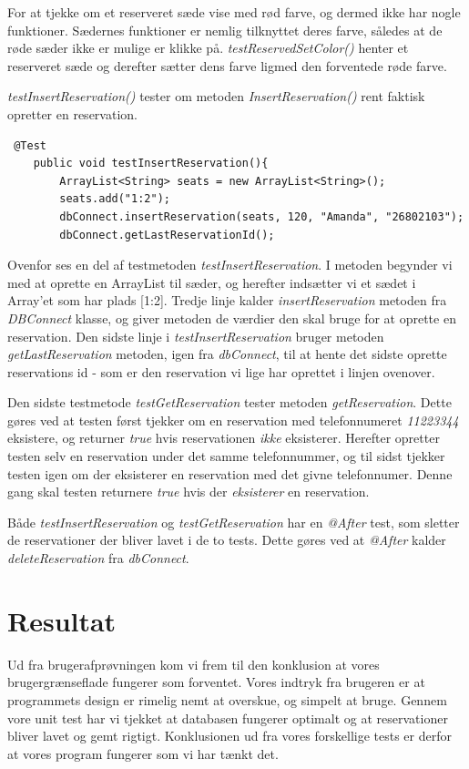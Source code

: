 \documentclass[final]{report}
\begin{document}
For at tjekke om et reserveret sæde vise med rød farve, og dermed ikke har nogle funktioner. Sædernes funktioner er nemlig tilknyttet deres farve, således at de røde sæder ikke er mulige er klikke på. \emph{testReservedSetColor()} henter et reserveret sæde og derefter sætter dens farve ligmed den forventede røde farve. 

\emph{testInsertReservation()} tester om metoden \emph{InsertReservation()} rent faktisk opretter en reservation. \\
\begin{verbatim}
 @Test
    public void testInsertReservation(){
        ArrayList<String> seats = new ArrayList<String>();
        seats.add("1:2");
        dbConnect.insertReservation(seats, 120, "Amanda", "26802103");
        dbConnect.getLastReservationId();
\end{verbatim}
 
Ovenfor ses en del af testmetoden \emph{testInsertReservation}. I metoden begynder vi med at oprette en ArrayList til sæder, og herefter indsætter vi et sædet i Array'et som har plads [1:2]. Tredje linje kalder \emph{insertReservation} metoden fra \emph{DBConnect} klasse, og giver metoden de værdier den skal bruge for at oprette en reservation. Den sidste linje i \emph{testInsertReservation} bruger metoden \emph{getLastReservation} metoden, igen fra \emph{dbConnect}, til at hente det sidste oprette reservations id - som er den reservation vi lige har oprettet i linjen ovenover. 

Den sidste testmetode \emph{testGetReservation} tester metoden \emph{getReservation}. Dette gøres ved at testen først tjekker om en reservation med telefonnumeret \emph{11223344} eksistere, og returner \emph{true} hvis reservationen \emph{ikke} eksisterer. Herefter opretter testen selv en reservation under det samme telefonnummer, og til sidst tjekker testen igen om der eksisterer en reservation med det givne telefonnumer. Denne gang skal testen returnere \emph{true} hvis der \emph{eksisterer} en reservation. 

Både \emph{testInsertReservation} og \emph{testGetReservation} har en \emph{@After} test, som sletter de reservationer der bliver lavet i de to tests. Dette gøres ved at \emph{@After} kalder \emph{deleteReservation} fra \emph{dbConnect}.


\section{Resultat}
Ud fra brugerafprøvningen kom vi frem til den konklusion at vores brugergrænseflade fungerer som forventet. Vores indtryk fra brugeren er at programmets design er rimelig nemt at overskue, og simpelt at bruge. Gennem vore unit test har vi tjekket at databasen fungerer optimalt og at reservationer bliver lavet og gemt rigtigt. Konklusionen ud fra vores forskellige tests er derfor at vores program fungerer som vi har tænkt det. 
\end{document}
